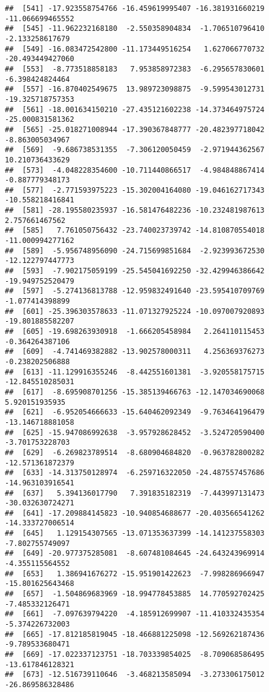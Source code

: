 \documentclass[
]{article}
\begin{document}
\begin{verbatim}
##  [541] -17.923558754766 -16.459619995407 -16.381931660219 -11.066699465552
##  [545] -11.962232168180  -2.550358904834  -1.706510796410  -2.133258617679
##  [549] -16.083472542800 -11.173449516254   1.627066770732 -20.493449427060
##  [553]  -8.773518858183   7.953858972383  -6.295657830601  -6.398424824464
##  [557] -16.870402549675  13.989723098875  -9.599543012731 -19.325718757353
##  [561] -18.001634150210 -27.435121602238 -14.373464975724 -25.000831581362
##  [565] -25.018271008944 -17.390367848777 -20.482397718042  -8.863005034967
##  [569]  -9.686738531355  -7.306120050459  -2.971944362567  10.210736433629
##  [573]  -4.048228354600 -10.711440866517  -4.984848867414  -0.887779348173
##  [577]  -2.771593975223 -15.302004164080 -19.046162717343 -10.558218416841
##  [581] -28.195580235937 -16.581476482236 -10.232481987613   2.757661467562
##  [585]   7.761050756432 -23.740023739742 -14.810870554018 -11.000994277162
##  [589]  -5.956748956090 -24.715699851684  -2.923993672530 -12.122797447773
##  [593]  -7.902175059199 -25.545041692250 -32.429946386642 -19.949752520479
##  [597]  -5.274136813788 -12.959832491640 -23.595410709769  -1.077414398899
##  [601] -25.396303578633 -11.071327925224 -10.097007920893 -19.801885582207
##  [605] -19.698263930918  -1.666205458984   2.264110115453  -0.364264387106
##  [609]  -4.741469382882 -13.902578000311   4.256369376273  -0.238202506888
##  [613] -11.129916355246  -8.442551601381  -3.920558175715 -12.845510285031
##  [617]  -8.695908701256 -15.385139466763 -12.147034690068   5.920151935935
##  [621]  -6.952054666633 -15.640462092349  -9.763464196479 -13.146718881058
##  [625] -15.947086992638  -3.957928628452  -3.524720590400  -3.701753228703
##  [629]  -6.269823789514  -8.680904684820  -0.963782800282 -12.571361872379
##  [633] -14.313750128974  -6.259716322050 -24.487557457686 -14.963103916541
##  [637]   5.394136017790   7.391835182319  -7.443997131473 -30.032630724271
##  [641] -17.209884145823 -10.940854688677 -20.403566541262 -14.333727006514
##  [645]   1.129154307565 -13.071353637399 -14.141237558303  -7.802755749097
##  [649] -20.977375285081  -8.607481084645 -24.643243969914  -4.355115564552
##  [653]   1.386941676272 -15.951901422623  -7.998286966947 -15.801625643468
##  [657]  -1.504869683969 -18.994778453885  14.770592702425  -7.485332126471
##  [661]  -7.097639794220  -4.185912699907 -11.410332435354  -5.374226732003
##  [665] -17.812185819045 -18.466881225098 -12.569262187436  -9.789533680471
##  [669] -17.022337123751 -18.703339854025  -8.709068586495 -13.617846128321
##  [673] -12.516739110646  -3.468213585094  -3.273306175012 -26.869586328486

\end{verbatim}
\end{document}
